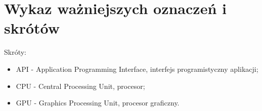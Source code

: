 \chapter*{Wykaz ważniejszych oznaczeń i skrótów}

Skróty:
\begin{itemize}
\item{API} - Application Programming Interface, interfejs programistyczny aplikacji;
\item{CPU} - Central Processing Unit, procesor;
\item{GPU} - Graphics Processing Unit, procesor graficzny.
\end{itemize}